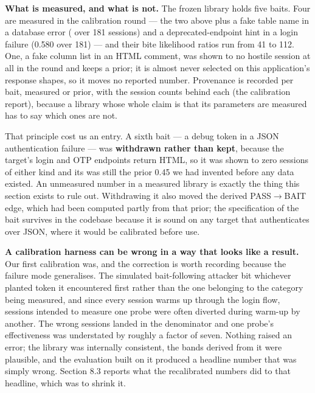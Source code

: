 \textbf{What is measured, and what is not.} The frozen library holds five baits. Four
are measured in the calibration round --- the two above plus a fake table name in a
database error ( over 181 sessions) and a deprecated-endpoint
hint in a login failure (0.580 over 181) --- and their bite likelihood ratios run
from 41 to 112. One, a fake column list in an HTML comment, was shown to no
hostile session at all in the round and keeps a prior; it is almost never selected
on this application's response shapes, so it moves no reported number. Provenance
is recorded per bait, measured or prior, with the session counts behind each
(the calibration report), because a library whose whole claim is
that its parameters are measured has to say which ones are not.

That principle cost us an entry. A sixth bait --- a debug token in a JSON
authentication failure --- was \textbf{withdrawn rather than kept}, because the target's
login and OTP endpoints return HTML, so it was shown to zero sessions of either
kind and its  was still the prior 0.45 we had invented before any data
existed. An unmeasured number in a measured library is exactly the thing this
section exists to rule out. Withdrawing it also moved the derived PASS$\rightarrow$BAIT edge,
which had been computed partly from that prior; the specification of the bait
survives in the codebase because it is sound on any target that authenticates over
JSON, where it would be calibrated before use.

\textbf{A calibration harness can be wrong in a way that looks like a result.} Our first
calibration was, and the correction is worth recording because the failure mode
generalises. The simulated bait-following attacker bit whichever planted token it
encountered first rather than the one belonging to the category being measured, and
since every session warms up through the login flow, sessions intended to measure
one probe were often diverted during warm-up by another. The wrong sessions landed
in the denominator and one probe's effectiveness was understated by roughly a factor
of seven. Nothing raised an error; the library was internally consistent, the bands
derived from it were plausible, and the evaluation built on it produced a headline
number that was simply wrong. Section 8.3 reports what the recalibrated numbers did
to that headline, which was to shrink it.
